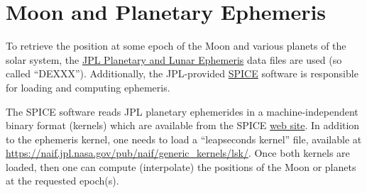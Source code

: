 \section{Moon and Planetary Ephemeris}\label{sec:moonandplanetaryephemeris}

To retrieve the position at some epoch of the Moon and various planets of the 
solar system, the \href{https://ssd.jpl.nasa.gov/planets/eph\_export.html}{JPL Planetary and Lunar Ephemeris} 
data files are used (so called ``DEXXX''). Additionally, the JPL-provided 
\href{https://naif.jpl.nasa.gov/naif/toolkit.html}{SPICE} software is responsible 
for loading and computing ephemeris.

The SPICE software reads JPL planetary ephemerides in a machine-independent 
binary format (kernels) which are available from the SPICE \href{ftp://ssd.jpl.nasa.gov/pub/eph/planets/bsp}{web site}.
In addition to the ephemeris kernel, one needs to load a ``leapseconds kernel'' 
file, available at \href{https://naif.jpl.nasa.gov/pub/naif/generic\_kernels/lsk/}{https://naif.jpl.nasa.gov/pub/naif/generic\_kernels/lsk/}.
Once both kernels are loaded, then one can compute (interpolate) the positions 
of the Moon or planets at the requested epoch(s).
